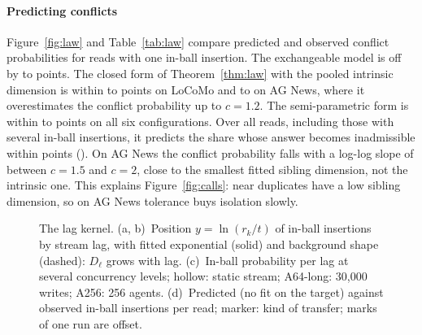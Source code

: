 \documentclass[sigconf, nonacm, review]{acmart}
\begin{document}
\paragraph{Predicting conflicts}
Figure~\ref{fig:law} and Table~\ref{tab:law} compare predicted and
observed conflict probabilities for reads with one in-ball insertion.
The exchangeable model is off by  to 
points. The closed form of Theorem~\ref{thm:law} with the pooled
intrinsic dimension is within  to
 points on LoCoMo and  to
 on AG News, where it overestimates the
conflict probability up to $c=1.2$. The semi-parametric form is within  to
 points on all six configurations. Over all reads,
including those with several in-ball insertions, it predicts the share
whose answer becomes inadmissible within  points
(\appLaw). On AG News the conflict
probability falls with a log-log slope of  between
$c=1.5$ and $c=2$, close to the smallest fitted sibling dimension,
not the intrinsic one. This explains Figure~\ref{fig:calls}:
near duplicates have a low sibling dimension, so on AG News tolerance
buys isolation slowly.

\begin{figure}[t]
\centering
{}
\caption{The lag kernel. (a, b)~Position $y=\ln(r_k/t)$ of in-ball
  insertions by stream lag, with fitted exponential (solid) and
  background shape (dashed): $D_\ell$ grows with lag.
  (c)~In-ball probability per lag at several concurrency levels;
  hollow: static stream; A64-long: 30{,}000 writes; A256: 256 agents. (d)~Predicted (no fit on the target) against
  observed in-ball insertions per read; marker: kind of transfer; marks of one run are offset.}
\label{fig:lag}
\end{figure}
\end{document}
